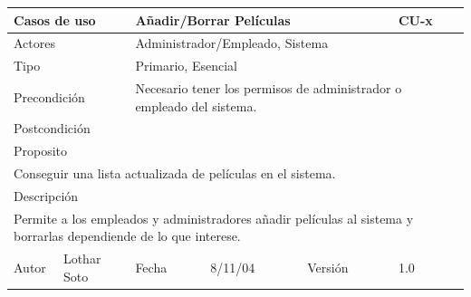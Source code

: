 \documentclass{article}
\begin{document}
\begin{table}[h]
\begin{tabular}{|l|l|l|l|l|l|}
\hline
\multicolumn{2}{|p{2cm}|}{Casos de uso}  & \multicolumn{3}{p{7cm}|}{Añadir/Borrar Películas} & CU-x \\
\hline
\multicolumn{2}{|p{2cm}|}{Actores}       & \multicolumn{4}{p{8cm}|}{Administrador/Empleado, Sistema}        \\
\hline
\multicolumn{2}{|p{2cm}|}{Tipo}          & \multicolumn{4}{p{8cm}|}{Primario, Esencial}        \\
\hline
\multicolumn{2}{|p{2cm}|}{Precondición}  & \multicolumn{4}{p{8cm}|}{Necesario tener los permisos de administrador o empleado del sistema.}        \\
\hline
\multicolumn{2}{|p{2cm}|}{Postcondición} & \multicolumn{4}{p{8cm}|}{}        \\
\hline
\multicolumn{6}{|p{10cm}|}{Proposito}                                   \\
\hline
\multicolumn{6}{|p{10cm}|}{Conseguir una lista actualizada de películas en el sistema.}                                            \\
\hline
\multicolumn{6}{|p{10cm}|}{Descripción}                                 \\
\hline
\multicolumn{6}{|p{10cm}|}{Permite a los empleados y administradores añadir películas al sistema y borrarlas dependiende de lo que interese.}                                            \\
\hline
Autor          &       Lothar Soto        & Fecha    &  8/11/04   &   Versión  & 1.0\\    
\hline
\end{tabular}
\end{table}
\end{document}
